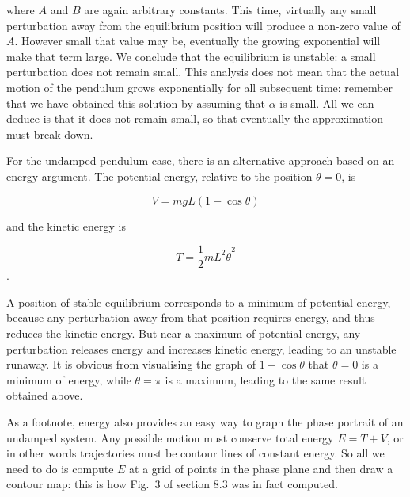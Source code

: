   \noindent{}where $A$ and $B$ are again arbitrary constants. This time, 
  virtually any small perturbation away from the equilibrium position will 
  produce a non-zero value of $A$. However small that value may be, eventually 
  the growing exponential will make that term large. We conclude that the 
  equilibrium is unstable: a small perturbation does not remain small. This 
  analysis does not mean that the actual motion of the pendulum grows 
  exponentially for all subsequent time: remember that we have obtained this 
  solution by assuming that $\alpha$ is small. All we can deduce is that it 
  does not remain small, so that eventually the approximation must break down. 

  For the undamped pendulum case, there is an alternative approach based on an 
  energy argument. The potential energy, relative to the position $\theta =0$, 
  is 

  \begin{equation*}V=mgL(1- \cos \theta) \tag{6}\end{equation*} 

  \noindent{}and the kinetic energy is 

  $$T=\dfrac{1}{2} m L^2 \dot{\theta}^2 \tag{7}$$. 

  A position of stable equilibrium corresponds to a minimum of potential 
  energy, because any perturbation away from that position requires energy, and 
  thus reduces the kinetic energy. But near a maximum of potential energy, any 
  perturbation releases energy and increases kinetic energy, leading to an 
  unstable runaway. It is obvious from visualising the graph of $1-\cos \theta$ 
  that $\theta = 0$ is a minimum of energy, while $\theta = \pi$ is a maximum, 
  leading to the same result obtained above. 

  As a footnote, energy also provides an easy way to graph the phase portrait 
  of an undamped system. Any possible motion must conserve total energy 
  $E=T+V$, or in other words trajectories must be contour lines of constant 
  energy. So all we need to do is compute $E$ at a grid of points in the phase 
  plane and then draw a contour map: this is how Fig.\ 3 of section 8.3 was in 
  fact computed. 